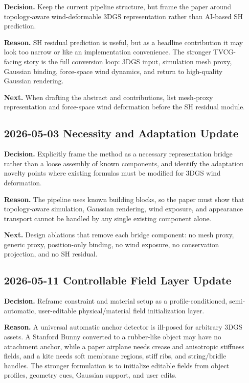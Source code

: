 \documentclass[11pt]{article}
\begin{document}
\textbf{Decision.} Keep the current pipeline structure, but frame the paper around topology-aware wind-deformable 3DGS representation rather than AI-based SH prediction.

\textbf{Reason.} SH residual prediction is useful, but as a headline contribution it may look too narrow or like an implementation convenience. The stronger TVCG-facing story is the full conversion loop: 3DGS input, simulation mesh proxy, Gaussian binding, force-space wind dynamics, and return to high-quality Gaussian rendering.

\textbf{Next.} When drafting the abstract and contributions, list mesh-proxy representation and force-space wind deformation before the SH residual module.

\subsection*{2026-05-03 Necessity and Adaptation Update}

\textbf{Decision.} Explicitly frame the method as a necessary representation bridge rather than a loose assembly of known components, and identify the adaptation novelty points where existing formulas must be modified for 3DGS wind deformation.

\textbf{Reason.} The pipeline uses known building blocks, so the paper must show that topology-aware simulation, Gaussian rendering, wind exposure, and appearance transport cannot be handled by any single existing component alone.

\textbf{Next.} Design ablations that remove each bridge component: no mesh proxy, generic proxy, position-only binding, no wind exposure, no conservation projection, and no SH residual.

\subsection*{2026-05-11 Controllable Field Layer Update}

\textbf{Decision.} Reframe constraint and material setup as a profile-conditioned, semi-automatic, user-editable physical/material field initialization layer.

\textbf{Reason.} A universal automatic anchor detector is ill-posed for arbitrary 3DGS assets. A Stanford Bunny converted to a rubber-like object may have no attachment anchor, while a paper airplane needs crease and anisotropic stiffness fields, and a kite needs soft membrane regions, stiff ribs, and string/bridle handles. The stronger formulation is to initialize editable fields from object profiles, geometry cues, Gaussian support, and user edits.
\end{document}
